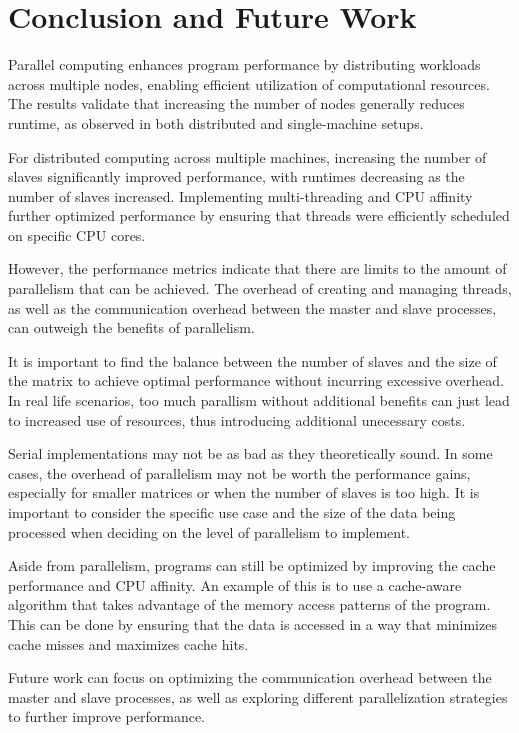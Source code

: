 \documentclass[journal]{./IEEE/IEEEtran}
\begin{document}
\section{Conclusion and Future Work}
Parallel computing enhances program performance by distributing workloads across multiple nodes, enabling efficient utilization of computational resources. The results validate that increasing the number of nodes generally reduces runtime, as observed in both distributed and single-machine setups.

For distributed computing across multiple machines, increasing the number of slaves significantly improved performance, with runtimes decreasing as the number of slaves increased. Implementing multi-threading and CPU affinity further optimized performance by ensuring that threads were efficiently scheduled on specific CPU cores.

However, the performance metrics indicate that there are limits to the amount of parallelism that can be achieved. The overhead of creating and managing threads, as well as the communication overhead between the master and slave processes, can outweigh the benefits of parallelism.

It is important to find the balance between the number of slaves and the size of the matrix to achieve optimal performance without incurring excessive overhead. In real life scenarios, too much parallism without additional benefits can just lead to increased use of resources, thus introducing additional unecessary costs.

Serial implementations may not be as bad as they theoretically sound. In some cases, the overhead of parallelism may not be worth the performance gains, especially for smaller matrices or when the number of slaves is too high. It is important to consider the specific use case and the size of the data being processed when deciding on the level of parallelism to implement.

Aside from parallelism, programs can still be optimized by improving the cache performance and CPU affinity. An example of this is to use a cache-aware algorithm that takes advantage of the memory access patterns of the program. This can be done by ensuring that the data is accessed in a way that minimizes cache misses and maximizes cache hits.

Future work can focus on optimizing the communication overhead between the master and slave processes, as well as exploring different parallelization strategies to further improve performance.
\end{document}
